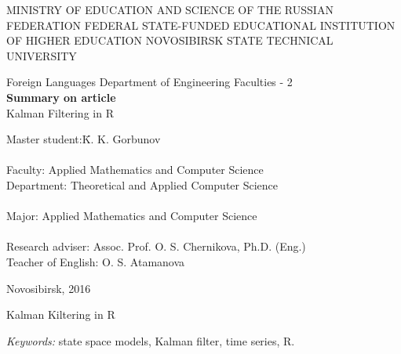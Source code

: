 \documentclass[a4paper,14pt]{extarticle}
\begin{document}
\setcounter{secnumdepth}{0}

\begin{titlepage}

	\begin{center}
		\MakeTextUppercase{ministry of education and science of the russian
			federation}
		\bigbreak
		\MakeTextUppercase{federal state-funded educational institution of higher
			education novosibirsk state technical university}
		
		\vspace{125pt}
		
		Foreign Languages Department of Engineering Faculties - 2 \\
		\vspace{100pt}
		\textbf{Summary on article} \\
		\smallbreak
		Kalman Filtering in R
		\vspace{75pt}
	\end{center}

	\begin{flushleft}
	\begin{tabbing}
	Master student:\quad\quad \= K. K. Gorbunov \\
	\\
	Faculty:          \> Applied Mathematics and Computer Science \\
	Department:       \> Theoretical and Applied Computer Science \\
	\\
	Major:            \> Applied Mathematics and Computer Science \\
	\\
	Research adviser: \> Assoc. Prof. O. S. Chernikova, Ph.D. (Eng.)
	\\
	Teacher of English: \> O. S. Atamanova
	\end{tabbing}
	\end{flushleft}

	\begin{center}
		\vspace{\fill}
		Novosibirsk, 2016
	\end{center}

\end{titlepage}

\newpage

\begin{center}
	Kalman Kiltering in R
\end{center}

\textit{Keywords:} state space models, Kalman filter, time series, R. \\
\end{document}
